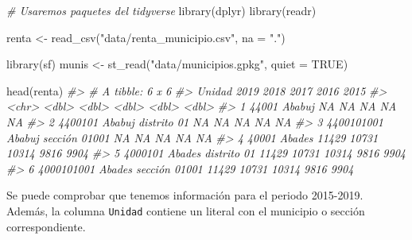 \documentclass[
]{report}
\newenvironment{Shaded}{\begin{snugshade}}{\end{snugshade}}
\newcommand{\AttributeTok}[1]{\textcolor[rgb]{0.77,0.63,0.00}{#1}}
\newcommand{\CommentTok}[1]{\textcolor[rgb]{0.56,0.35,0.01}{\textit{#1}}}
\newcommand{\ConstantTok}[1]{\textcolor[rgb]{0.00,0.00,0.00}{#1}}
\newcommand{\FunctionTok}[1]{\textcolor[rgb]{0.00,0.00,0.00}{#1}}
\newcommand{\NormalTok}[1]{#1}
\newcommand{\OtherTok}[1]{\textcolor[rgb]{0.56,0.35,0.01}{#1}}
\newcommand{\StringTok}[1]{\textcolor[rgb]{0.31,0.60,0.02}{#1}}
\theoremstyle{definition}
\theoremstyle{definition}
\theoremstyle{definition}
\theoremstyle{definition}
\theoremstyle{remark}
\begin{document}
\begin{Shaded}
\begin{Highlighting}[]
\CommentTok{\# Usaremos paquetes del tidyverse}
\FunctionTok{library}\NormalTok{(dplyr)}
\FunctionTok{library}\NormalTok{(readr)}

\NormalTok{renta }\OtherTok{\textless{}{-}} \FunctionTok{read\_csv}\NormalTok{(}\StringTok{"data/renta\_municipio.csv"}\NormalTok{, }\AttributeTok{na =} \StringTok{"."}\NormalTok{)}
\end{Highlighting}
\end{Shaded}

\begin{Shaded}
\begin{Highlighting}[]
\FunctionTok{library}\NormalTok{(sf)}
\NormalTok{munis }\OtherTok{\textless{}{-}} \FunctionTok{st\_read}\NormalTok{(}\StringTok{"data/municipios.gpkg"}\NormalTok{, }\AttributeTok{quiet =} \ConstantTok{TRUE}\NormalTok{)}
\end{Highlighting}
\end{Shaded}

\begin{Shaded}
\begin{Highlighting}[]
\FunctionTok{head}\NormalTok{(renta)}
\CommentTok{\#\textgreater{} \# A tibble: 6 x 6}
\CommentTok{\#\textgreater{}   Unidad                          \textasciigrave{}2019\textasciigrave{} \textasciigrave{}2018\textasciigrave{} \textasciigrave{}2017\textasciigrave{} \textasciigrave{}2016\textasciigrave{} \textasciigrave{}2015\textasciigrave{}}
\CommentTok{\#\textgreater{}   \textless{}chr\textgreater{}                            \textless{}dbl\textgreater{}  \textless{}dbl\textgreater{}  \textless{}dbl\textgreater{}  \textless{}dbl\textgreater{}  \textless{}dbl\textgreater{}}
\CommentTok{\#\textgreater{} 1 44001 Ababuj                        NA     NA     NA     NA     NA}
\CommentTok{\#\textgreater{} 2 4400101 Ababuj distrito 01          NA     NA     NA     NA     NA}
\CommentTok{\#\textgreater{} 3 4400101001 Ababuj sección 01001     NA     NA     NA     NA     NA}
\CommentTok{\#\textgreater{} 4 40001 Abades                     11429  10731  10314   9816   9904}
\CommentTok{\#\textgreater{} 5 4000101 Abades distrito 01       11429  10731  10314   9816   9904}
\CommentTok{\#\textgreater{} 6 4000101001 Abades sección 01001  11429  10731  10314   9816   9904}
\end{Highlighting}
\end{Shaded}

Se puede comprobar que tenemos información para el periodo 2015-2019. Además, la
columna \texttt{Unidad} contiene un literal con el municipio o sección correspondiente.
\end{document}
